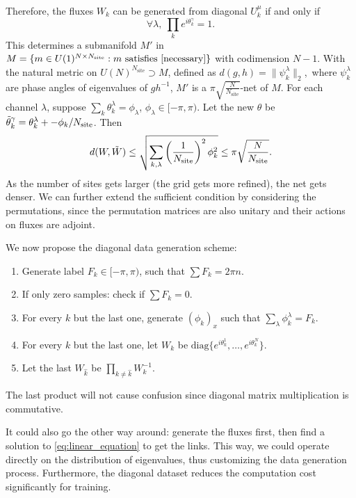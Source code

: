 Therefore, the fluxes $W_k$ can be generated from diagonal $U_k^\mu$ if and only if
\begin{equation}
\forall \lambda,\  \prod_k  e^{i\theta_k^\gamma}=1.
\label{sufficient}
\end{equation}
This determines a submanifold $M'$ in $M=\{m\in U(1)^{N\times N_{\text{site}}}: m \text{ satisfies }\eqref{necessary}\}$ with codimension $N-1$. 
With the natural metric on $U(N)^{N_\text{site}}\supset M$,  defined as $d(g,h)=\|\psi_k^\lambda\|_2$,\ where $\psi_k^\lambda$ are phase angles of eigenvalues of $gh^{-1}$, $M'$ is a $\pi\sqrt{\frac{N}{N_\text{site}}}$-net of $M$.
For each channel $\lambda$, suppose $\sum_k \theta_{k}^\lambda = \phi_\lambda$, $\phi_\lambda \in [-\pi, \pi)$. Let the new $\theta$ be $\Tilde{\theta}_{k}^\gamma = \theta_{k}^\lambda + -\phi_k/N_\text{site}$. 
Then $$d(W, \Tilde{W})\leq \sqrt{\sum_{k,\lambda} \left(\frac{1}{N_\text{site}}\right)^2\phi_k^2}\leq \pi \sqrt{\frac{N}{N_\text{site}}}.$$As the number of sites gets larger (the grid gets more refined), the net gets denser. We can further extend the sufficient condition by considering the permutations, since the permutation matrices are also unitary and their actions on fluxes are adjoint.

We now propose the diagonal data generation scheme:
\begin{enumerate}
    \item Generate label $F_k\in [-\pi, \pi)$, such that $\sum F_k = 2\pi n$.
    \item If only zero samples: check if $\sum F_k=0$.
    \item For every $k$ but the last one, generate $(\phi_k)_x$ such that $\sum_\lambda\phi_k^\lambda=F_k$.
    \item For every $k$ but the last one, let $W_k$ be $\text{diag} \{e^{i\theta_k^1},\dots, e^{i\theta_k^N}\}$.
    \item Let the last $W_{\hat{k}}$ be $\prod_{k\neq \hat{k}} W_{k}^{-1}$.
\end{enumerate}
The last product will not cause confusion since diagonal matrix multiplication is commutative.

It could also go the other way around: generate the fluxes first, then find a solution to \eqref{eq:linear_equation} to get the links. This way, we could operate directly on the distribution of eigenvalues, thus customizing the data generation process. Furthermore, the diagonal dataset reduces the computation cost significantly for training.


